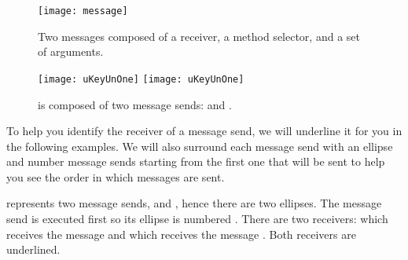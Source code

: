 \documentclass[a4paper,10pt,twoside]{book}
\begin{document}
\begin{figure}[htb]
\begin{minipage}{0.53\textwidth}
	\begin{center}
	\texttt{[image: message]}
	\caption{Two messages composed of a receiver, a method selector, and a set of arguments.\label{fig:firstScriptMessage}}\end{center}
\end{minipage}
\hfill
\begin{minipage}{0.43\textwidth}
	\begin{center}
	\ifluluelse
		{\texttt{[image: uKeyUnOne]}}
		{\texttt{[image: uKeyUnOne]}}
	\caption{ is composed of two message sends:  and .\label{fig:ellipse}}
	\end{center}
\end{minipage}
\end{figure}



To help you identify the receiver of a message send, we will underline it for you in the following examples.
We will also surround each message send with an ellipse and number message sends starting from the first one that will be sent to help you see the order in which messages are sent.


 represents two message sends,  and , hence there are two ellipses.
The message send  is executed first so its ellipse is numbered .
There are two receivers:  which receives the message  and  which receives the message .
Both receivers are underlined.
\end{document}
